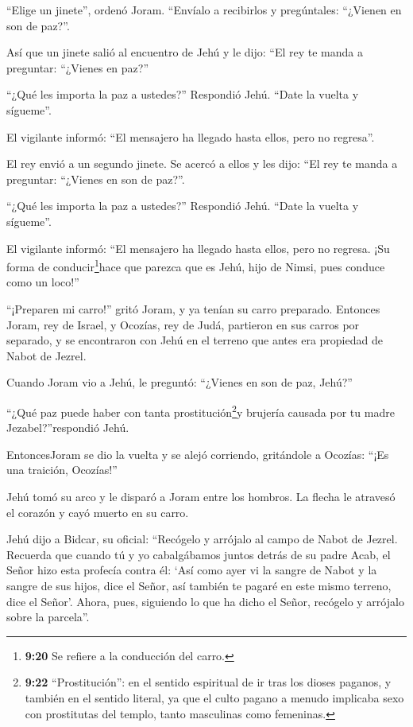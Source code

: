 ``Elige un jinete'', ordenó Joram. ``Envíalo a recibirlos y pregúntales:
``¿Vienen en son de paz?''.

 Así que un jinete salió al encuentro de Jehú y le dijo:
``El rey te manda a preguntar: ``¿Vienes en paz?''

``¿Qué les importa la paz a ustedes?'' Respondió Jehú. ``Date la vuelta
y sígueme''.

El vigilante informó: ``El mensajero ha llegado hasta ellos, pero no
regresa''.

 El rey envió a un segundo jinete. Se acercó a ellos y les
dijo: ``El rey te manda a preguntar: ``¿Vienes en son de paz?''.

``¿Qué les importa la paz a ustedes?'' Respondió Jehú. ``Date la vuelta
y sígueme''.

 El vigilante informó: ``El mensajero ha llegado hasta
ellos, pero no regresa. ¡Su forma de conducir\footnote{\textbf{9:20} Se
  refiere a la conducción del carro.}hace que parezca que es Jehú, hijo
de Nimsi, pues conduce como un loco!''

 ``¡Preparen mi carro!'' gritó Joram, y ya tenían su carro
preparado. Entonces Joram, rey de Israel, y Ocozías, rey de Judá,
partieron en sus carros por separado, y se encontraron con Jehú en el
terreno que antes era propiedad de Nabot de Jezrel.

 Cuando Joram vio a Jehú, le preguntó: ``¿Vienes en son de
paz, Jehú?''

``¿Qué paz puede haber con tanta prostitución\footnote{\textbf{9:22}
  ``Prostitución'': en el sentido espiritual de ir tras los dioses
  paganos, y también en el sentido literal, ya que el culto pagano a
  menudo implicaba sexo con prostitutas del templo, tanto masculinas
  como femeninas.}y brujería causada por tu madre Jezabel?''respondió
Jehú.

 EntoncesJoram se dio la vuelta y se alejó corriendo,
gritándole a Ocozías: ``¡Es una traición, Ocozías!''

 Jehú tomó su arco y le disparó a Joram entre los hombros.
La flecha le atravesó el corazón y cayó muerto en su carro.

 Jehú dijo a Bidcar, su oficial: ``Recógelo y arrójalo al
campo de Nabot de Jezrel. Recuerda que cuando tú y yo cabalgábamos
juntos detrás de su padre Acab, el Señor hizo esta profecía contra él:
 `Así como ayer vi la sangre de Nabot y la sangre de sus
hijos, dice el Señor, así también te pagaré en este mismo terreno, dice
el Señor'. Ahora, pues, siguiendo lo que ha dicho el Señor, recógelo y
arrójalo sobre la parcela''.

